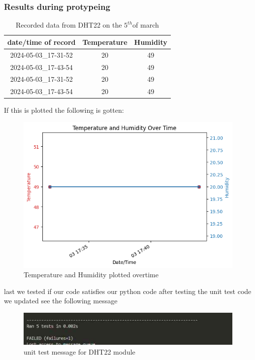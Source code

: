 \subsubsection{Results during protypeing}
\begin{table}[h!]
    \centering
    \begin{tabular}{|c|c|c|}
        \hline
        date/time of record & Temperature &Humidity \\
        \hline\hline
        2024-05-03\_17-31-52&20&49\\
        2024-05-03\_17-43-54&20&49\\
        2024-05-03\_17-31-52&20&49\\
        2024-05-03\_17-43-54&20&49\\
        \hline
    \end{tabular}
    \caption{Recorded data from  DHT22 on the $5^{th}$of march}
    \label{Recorded data from  DHT22 on the 5th of march}
\end{table}
If this is  plotted the following is gotten:
\begin{figure}[h!]
    \centering
    \includegraphics[width=0.5\linewidth]{Images/temp_and_humidity_over_time.png}
    \caption{Temperature and Humidity plotted overtime}
    \label{Temperature and Humidity plotted overtime}
\end{figure} 
last we tested if our code  satisfies our  python code after testing the unit test code we updated see the following message
\begin{figure}[h!]
    \centering
    \includegraphics[width=0.5\linewidth]{Images/unit_testoutput.jpg}
    \caption{unit test message for DHT22 module}
    \label{unit test message for DHT22 module}
\end{figure}
\newpage
